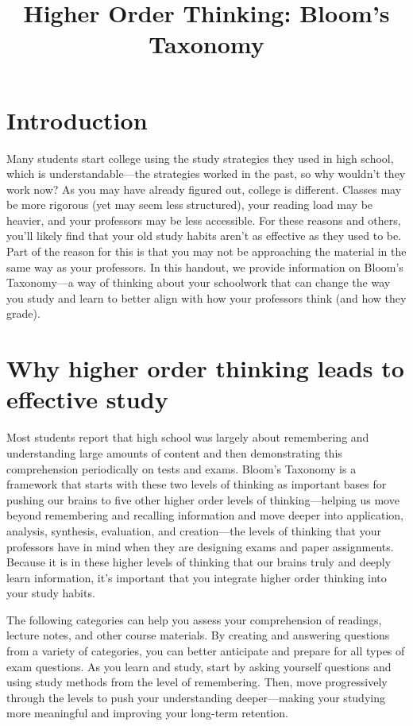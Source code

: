 \documentclass[../main.tex]{subfiles}
\title{Higher Order Thinking: Bloom's Taxonomy}
\begin{document}
\maketitle
\section{Introduction}
Many students start college using the study strategies they used in high school,
which is understandable—the strategies worked in the past, so why wouldn't they
work now? As you may have already figured out, college is different. Classes may
be more rigorous (yet may seem less structured), your reading load may be
heavier, and your professors may be less accessible. For these reasons and
others, you'll likely find that your old study habits aren't as effective as
they used to be. Part of the reason for this is that you may not be approaching
the material in the same way as your professors. In this handout, we provide
information on Bloom's Taxonomy—a way of thinking about your schoolwork that can
change the way you study and learn to better align with how your professors
think (and how they grade).
%
\section{Why higher order thinking leads to effective study}
Most students report that high school was largely about remembering and
understanding large amounts of content and then demonstrating this comprehension
periodically on tests and exams. Bloom's Taxonomy is a framework that starts
with these two levels of thinking as important bases for pushing our brains to
five other higher order levels of thinking—helping us move beyond remembering
and recalling information and move deeper into application, analysis, synthesis,
evaluation, and creation—the levels of thinking that your professors have in
mind when they are designing exams and paper assignments. Because it is in these
higher levels of thinking that our brains truly and deeply learn information,
it's important that you integrate higher order thinking into your study habits.

The following categories can help you assess your comprehension of readings,
lecture notes, and other course materials. By creating and answering questions
from a variety of categories, you can better anticipate and prepare for all
types of exam questions. As you learn and study, start by asking yourself
questions and using study methods from the level of remembering. Then, move
progressively through the levels to push your understanding deeper—making your
studying more meaningful and improving your long-term retention.
%
\end{document}
